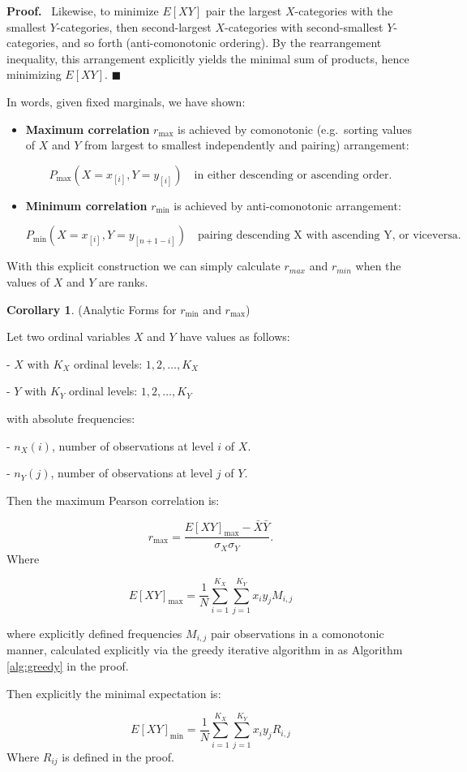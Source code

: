 \documentclass[
  12pt,
]{article}
\theoremstyle{plain}
\theoremstyle{definition}
\newtheorem{corollary}{Corollary}
\renewenvironment{proof}
   {\par\noindent\textbf{Proof.}\ }
   {\hfill$\blacksquare$\par}
\theoremstyle{remark}
\begin{document}
\begin{proof}
Likewise, to minimize \(E[XY]\) pair the largest \(X\)-categories with
the smallest \(Y\)-categories, then second-largest \(X\)-categories with
second-smallest \(Y\)-categories, and so forth (anti-comonotonic
ordering). By the rearrangement inequality, this arrangement explicitly
yields the minimal sum of products, hence minimizing \(E[XY]\).
\end{proof}

In words, given fixed marginals, we have shown:

\begin{itemize}
\item
  \textbf{Maximum correlation} \(r_{\text{max}}\) is achieved by
  comonotonic (e.g.~sorting values of \(X\) and \(Y\) from largest to
  smallest independently and pairing) arrangement:

  \[P_{\text{max}}(X=x_{[i]}, Y=y_{[i]}) \quad\text{in either descending or ascending order.}\]
\item
  \textbf{Minimum correlation} \(r_{\text{min}}\) is achieved by
  anti-comonotonic arrangement:

  \[P_{\text{min}}(X=x_{[i]}, Y=y_{[n+1-i]}) \quad\text{pairing descending X with ascending Y, or viceversa.}\]
\end{itemize}

With this explicit construction we can simply calculate \(r_{max}\) and
\(r_{min}\) when the values of \(X\) and \(Y\) are ranks.

\label{corr-min}
\begin{corollary} {(Analytic Forms for $r_{\min}$ and $r_{\max}$)}


Let two ordinal variables $X$ and $Y$ have values as follows:

- $X$ with $K_X$ ordinal levels: $1,2,\dots,K_X$
    
- $Y$ with $K_Y$ ordinal levels: $1,2,\dots,K_Y$
    
with absolute frequencies:

- $n_{X}(i)$, number of observations at level $i$ of $X$.
    
- $n_{Y}(j)$, number of observations at level $j$ of $Y$.
    

Then the maximum Pearson correlation is:

$$r_{\text{max}} = \frac{E[XY]_{\text{max}} - \bar{X}\bar{Y}}{\sigma_X \sigma_Y}.$$
Where 

$$
E[XY]_{\max} =\frac{1}{N}\sum_{i=1}^{K_X}\sum_{j=1}^{K_Y}x_i y_j M_{i,j}
$$

where explicitly defined frequencies $M_{i,j}$ pair observations in a comonotonic manner, calculated explicitly via the greedy iterative algorithm in as Algorithm  \ref{alg:greedy} in the proof.


Then explicitly the minimal expectation is:

$$E[XY]_{\text{min}}=\frac{1}{N}\sum_{i=1}^{K_X}\sum_{j=1}^{K_Y} x_i y_j R_{i,j}$$
Where $R_{ij}$ is defined in the proof.
\end{corollary}
\end{document}
